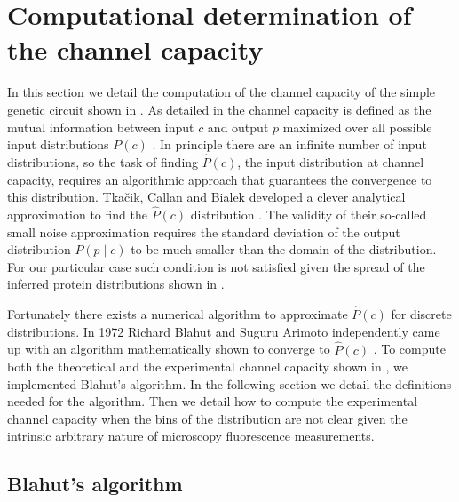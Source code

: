 \section{Computational determination of the channel capacity}
\label{supp_channcap}

In this section we detail the computation of the channel capacity of the simple
genetic circuit shown in . As detailed in
 the channel capacity is defined as the mutual information
between input $c$ and output $p$ maximized over all possible input distributions
$P(c)$ \cite{Shannon1948}. In principle there are an infinite number of input
distributions, so the task of finding $\hat{P}(c)$, the input distribution at
channel capacity, requires an algorithmic approach that guarantees the
convergence to this distribution. Tkačik, Callan and Bialek developed a clever
analytical approximation to find the $\hat{P}(c)$ distribution
\cite{Tkacik2008a}. The validity of their so-called small noise approximation
requires the standard deviation of the output distribution $P(p \mid c)$ to be
much smaller than the domain of the distribution. For our particular case such
condition is not satisfied given the spread of the inferred protein
distributions shown in .

Fortunately there exists a numerical algorithm to approximate $\hat{P}(c)$ for
discrete distributions. In 1972 Richard Blahut and Suguru Arimoto independently
came up with an algorithm mathematically shown to converge to $\hat{P}(c)$
\cite{Blahut1972}. To compute both the theoretical and the experimental channel
capacity shown in , we implemented Blahut's algorithm. In
the following section we detail the definitions needed for the algorithm. Then
we detail how to compute the experimental channel capacity when the bins of the
distribution are not clear given the intrinsic arbitrary nature of microscopy
fluorescence measurements.

\subsection{Blahut's algorithm}

